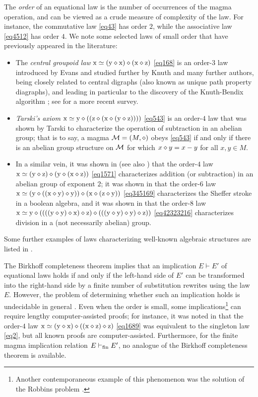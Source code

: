 The \emph{order} of an equational law is the number of occurrences of the magma operation, and can be viewed as a crude measure of complexity of the law. For instance, the commutative law \eqref{eq43} has order $2$, while the associative law \eqref{eq4512} has order $4$. We note some selected laws of small order that have previously appeared in the literature:
\begin{itemize}
\item The \emph{central groupoid law} $\mathrm{x} \simeq (\mathrm{y} \diamond \mathrm{x}) \diamond (\mathrm{x} \diamond \mathrm{z})$ \eqref{eq168} is an order-$3$ law introduced by Evans \cite{evans} and studied further by Knuth \cite{knuth} and many further authors, being closely related to central digraphs (also known as unique path property diagraphs), and leading in particular to the discovery of the Knuth-Bendix algorithm \cite{knuth-bendix}; see \cite{klt} for a more recent survey.
\item \emph{Tarski's axiom} $\mathrm{x} \simeq \mathrm{y} \diamond ( (\mathrm{z} \diamond (\mathrm{x} \diamond (\mathrm{y} \diamond \mathrm{z}))))$ \eqref{eq543} is an order-$4$ law that was shown by Tarski \cite{Tarski1938} to characterize the operation of subtraction in an abelian group; that is to say, a magma ${\mathcal{M}} = (M,\diamond)$ obeys \eqref{eq543} if and only if there is an abelian group structure on ${\mathcal{M}}$ for which $x \diamond y = x-y$ for all $x,y \in M$.
\item In a similar vein, it was shown in \cite{mendelsohn-padmanabhan} (see also \cite{meredith-prior}) that the order-$4$ law
$\mathrm{x} \simeq (\mathrm{y} \diamond \mathrm{z}) \diamond (\mathrm{y} \diamond (\mathrm{x} \diamond \mathrm{z}))$ \eqref{eq1571} characterizes addition (or subtraction) in an abelian group of exponent $2$; it was shown in \cite{mccune_et_al} that the order-$6$ law $\mathrm{x} \simeq (\mathrm{y} \diamond ((\mathrm{x} \diamond \mathrm{y}) \diamond \mathrm{y})) \diamond (\mathrm{x} \diamond (\mathrm{z} \diamond \mathrm{y}))$ \eqref{eq345169} characterizes the Sheffer stroke in a boolean algebra, and it was shown in \cite{higman-neumann} that the order-$8$ law
$\mathrm{x} \simeq \mathrm{y} \diamond ((((\mathrm{y} \diamond \mathrm{y}) \diamond \mathrm{x}) \diamond \mathrm{z}) \diamond (((\mathrm{y} \diamond \mathrm{y}) \diamond \mathrm{y}) \diamond \mathrm{z}))$ \eqref{eq42323216} characterizes division in a (not necessarily abelian) group.
\end{itemize}
Some further examples of laws characterizing well-known algebraic structures are listed in \cite{mccune-survey}.

The Birkhoff completeness theorem \cite[Th.~3.5.14]{term-rewriting} implies that an implication $E \vdash E'$ of equational laws holds if and only if the left-hand side of $E'$ can be transformed into the right-hand side by a finite number of substitution rewrites using the law $E$. However, the problem of determining whether such an implication holds is undecidable in general \cite{mckenzie}. Even when the order is small, some implications\footnote{Another contemporaneous example of this phenomenon was the solution of the Robbins problem \cite{robbins}.} can require lengthy computer-assisted proofs; for instance, it was noted in \cite{Kisielewicz2} that the order-$4$ law $\mathrm{x} \simeq (\mathrm{y} \diamond \mathrm{x}) \diamond ((\mathrm{x} \diamond \mathrm{z}) \diamond \mathrm{z})$ \eqref{eq1689} was equivalent to the singleton law \eqref{eq2}, but all known proofs are computer-assisted.  Furthermore, for the finite magma implication relation $E \vdash_{\mathrm{fin}} E'$, no analogue of the Birkhoff completeness theorem is available.

